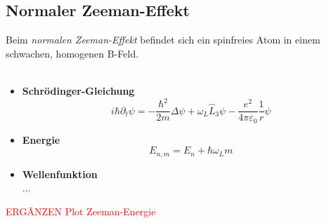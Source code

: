 \documentclass{article}
\begin{document}
\newpage


\subsection{Normaler Zeeman-Effekt}
Beim \textit{normalen Zeeman-Effekt} befindet sich ein spinfreies Atom in einem schwachen, homogenen B-Feld.\\
\\
	\begin{itemize}
		\item \textbf{Schrödinger-Gleichung}
			\begin{equation}
				i\hbar \partial_t \psi = -\frac{\hbar^2}{2m}\Delta \psi + \omega_L \hat{L}_3 \psi - \frac{e^2}{4\pi\varepsilon_0}\frac{1}{r} \psi
			\end{equation}
		
		
		\item \textbf{Energie}
			\begin{equation}
				E_{n,m} = E_n + \hbar\omega_L m
			\end{equation}
		
		
		\item \textbf{Wellenfunktion}\\
		...
	\end{itemize}

\textcolor{red}{ERGÄNZEN Plot Zeeman-Energie}


\newpage
\end{document}
